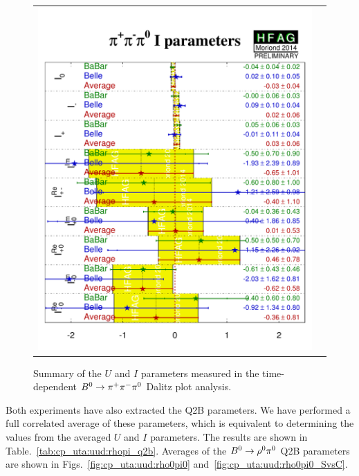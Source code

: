 \begin{figure}[htb]
\begin{center}
\begin{tabular}{cc}
{        \includegraphics{figures/cp_uta/pi+pi-pi0_I}
      }
    \end{tabular}
  \end{center}
  \vspace{-0.8cm}
  \caption{
    Summary of the $U$ and $I$ parameters measured in the 
    time-dependent $B^0 \to \pi^+\pi^-\pi^0$ Dalitz plot analysis.
  }
  \label{fig:cp_uta:uud:uandi}
\end{figure}

Both experiments have also extracted the Q2B parameters.
We have performed a full correlated average of these parameters,
which is equivalent to determining the values from the 
averaged $U$ and $I$ parameters.
The results are shown in Table.~\ref{tab:cp_uta:uud:rhopi_q2b}.
Averages of the $B^0 \to \rho^0\pi^0$ Q2B parameters are shown in 
Figs.~\ref{fig:cp_uta:uud:rho0pi0} and~\ref{fig:cp_uta:uud:rho0pi0_SvsC}.



